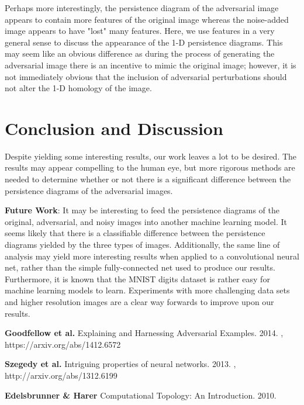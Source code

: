 \documentclass[twoside,twocolumn]{article}
\begin{document}
Perhaps more interestingly, the persistence diagram of the adversarial image appears to contain more features of the original image whereas the noise-added image appears to have "lost" many features. Here, we use features in a very general sense to discuss the appearance of the 1-D persistence diagrams. This may seem like an obvious difference as during the process of generating the adversarial image there is an incentive to mimic the original image; however, it is not immediately obvious that the inclusion of adversarial perturbations should not alter the 1-D homology of the image.


\section{Conclusion and Discussion}

Despite yielding some interesting results, our work leaves a lot to be desired. The results may appear compelling to the human eye, but more rigorous methods are needed to determine whether or not there is a significant difference between the persistence diagrams of the adversarial images.

\textbf{Future Work}: It may be interesting to feed the persistence diagrams of the original, adversarial, and noisy images into another machine learning model. It seems likely that there is a classifiable difference between the persistence diagrams yielded by the three types of images. Additionally, the same line of analysis may yield more interesting results when applied to a convolutional neural net, rather than the simple fully-connected net used to produce our results. Furthermore, it is known that the MNIST digits dataset is rather easy for machine learning models to learn. Experiments with more challenging data sets and higher resolution images are a clear way forwards to improve upon our results.




\begin{thebibliography}{99} %

\textbf{Goodfellow et al.}
\newblock Explaining and Harnessing Adversarial Examples. 2014.
, https://arxiv.org/abs/1412.6572

\textbf{Szegedy et al.}
\newblock Intriguing properties of neural networks. 2013.
, http://arxiv.org/abs/1312.6199
 
\textbf{Edelsbrunner \& Harer}
\newblock Computational Topology: An Introduction. 2010.
 
 
\end{thebibliography}

\end{document}
